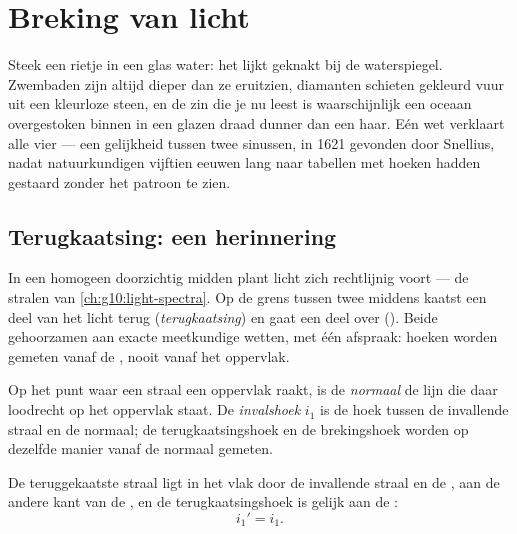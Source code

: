\chapter{Breking van licht}\label{ch:g10:refraction}

Steek een rietje in een glas water: het lijkt geknakt bij de
waterspiegel. Zwembaden zijn altijd dieper dan ze eruitzien, diamanten
schieten gekleurd vuur uit een kleurloze steen, en de zin die je nu leest
is waarschijnlijk een oceaan overgestoken binnen in een glazen draad
dunner dan een haar. Eén wet verklaart alle vier --- een gelijkheid
tussen twee sinussen, in 1621 gevonden door Snellius, nadat
natuurkundigen vijftien eeuwen lang naar tabellen met hoeken hadden
gestaard zonder het patroon te zien.

\section{Terugkaatsing: een herinnering}

In een homogeen doorzichtig midden plant licht zich rechtlijnig voort ---
de stralen van \cref{ch:g10:light-spectra}. Op de grens tussen twee
middens kaatst een deel van het licht terug (\emph{terugkaatsing}) en
gaat een deel over (\emph{}). Beide gehoorzamen aan exacte
meetkundige wetten, met één afspraak: hoeken worden gemeten vanaf de
\emph{}, nooit vanaf het oppervlak.

\begin{definition}\label{def:g10:refraction:angles}
Op het punt waar een straal een oppervlak raakt, is de
\emph{normaal} de lijn die daar loodrecht op het oppervlak
staat. De \emph{invalshoek} $i_1$ is de hoek tussen de
invallende straal en de normaal; de terugkaatsingshoek en de brekingshoek
worden op dezelfde manier vanaf de normaal gemeten.
\end{definition}

\begin{proposition}\label{prop:g10:refraction:reflection}
De teruggekaatste straal ligt in het vlak door de invallende straal en de
, aan de andere kant van de , en de terugkaatsingshoek is
gelijk aan de :
\[
i_1' = i_1 .
\]
\end{proposition}
\admitted

